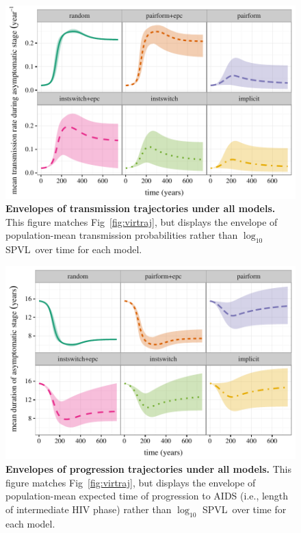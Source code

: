 \documentclass[10pt,letterpaper]{article}
\renewcommand{\figurename}{Fig}
\newcommand{\Lspvl}{$\log_{10}$ SPVL}
\begin{document}
\begin{figure}[!ht]
\includegraphics[width=\textwidth]{../figures/fig_S2_1.pdf}
\caption{{\bf Envelopes of transmission trajectories under all models.}
This figure matches \figurename~\ref{fig:virtraj}, but displays the
envelope of population-mean transmission probabilities rather than \Lspvl\ over time
for each model.
}
\label{fig:transtraj}
\end{figure}

\begin{figure}[!ht]
\includegraphics[width=\textwidth]{../figures/fig_S2_2.pdf}
\caption{{\bf Envelopes of progression trajectories under all models.}
This figure matches \figurename~\ref{fig:virtraj}, but displays the
envelope of population-mean expected time of progression to AIDS (i.e., length of
intermediate HIV phase) rather than \Lspvl\ over time
for each model.
}
\label{fig:durtraj}
\end{figure}
\end{document}
